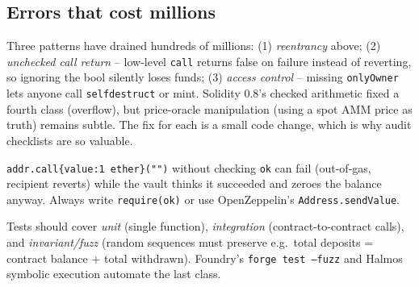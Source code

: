 \subsection{Errors that cost millions}\label{subsec:errors}
Three patterns have drained hundreds of millions: (1) \emph{reentrancy} above; (2) \emph{unchecked call return} -- low-level \texttt{call} returns false on failure instead of reverting, so ignoring the bool silently loses funds; (3) \emph{access control} -- missing \texttt{onlyOwner} lets anyone call \texttt{selfdestruct} or mint. Solidity 0.8's checked arithmetic fixed a fourth class (overflow), but price-oracle manipulation (using a spot AMM price as truth) remains subtle. The fix for each is a small code change, which is why audit checklists are so valuable.

\begin{example}\label{ex:unchecked}
\texttt{addr.call\{value:1 ether\}("")} without checking \texttt{ok} can fail (out-of-gas, recipient reverts) while the vault thinks it succeeded and zeroes the balance anyway. Always write \texttt{require(ok)} or use OpenZeppelin's \texttt{Address.sendValue}.
\end{example}

\begin{remark}\label{rem:testing}
Tests should cover \emph{unit} (single function), \emph{integration} (contract-to-contract calls), and \emph{invariant/fuzz} (random sequences must preserve e.g.\ total deposits = contract balance + total withdrawn). Foundry's \texttt{forge test --fuzz} and Halmos symbolic execution automate the last class.
\end{remark}

